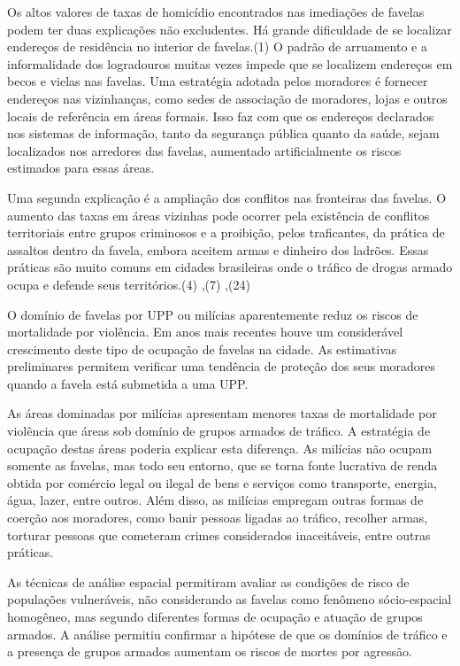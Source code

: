 \documentclass{article}
\begin{document}
Os altos valores de taxas de homicídio encontrados nas imediações de favelas
podem ter duas explicações não excludentes. Há grande dificuldade de se
localizar endereços de residência no interior de favelas.(1)
O padrão de arruamento e a informalidade dos logradouros muitas vezes impede que
se localizem endereços em becos e vielas nas favelas. Uma estratégia adotada
pelos moradores é fornecer endereços nas vizinhanças, como sedes de associação
de moradores, lojas e outros locais de referência em áreas formais. Isso faz com
que os endereços declarados nos sistemas de informação, tanto da segurança
pública quanto da saúde, sejam localizados nos arredores das favelas, aumentado
artificialmente os riscos estimados para essas áreas.

Uma segunda explicação é a ampliação dos conflitos nas fronteiras das favelas. O
aumento das taxas em áreas vizinhas pode ocorrer pela existência de conflitos
territoriais entre grupos criminosos e a proibição, pelos traficantes, da
prática de assaltos dentro da favela, embora aceitem armas e dinheiro dos
ladrões. Essas práticas são muito comuns em cidades brasileiras onde o tráfico
de drogas armado ocupa e defende seus territórios.(4)
,(7)
,(24)

O domínio de favelas por UPP ou milícias aparentemente reduz os riscos de
mortalidade por violência. Em anos mais recentes houve um considerável
crescimento deste tipo de ocupação de favelas na cidade. As estimativas
preliminares permitem verificar uma tendência de proteção dos seus moradores
quando a favela está submetida a uma UPP.

As áreas dominadas por milícias apresentam menores taxas de mortalidade por
violência que áreas sob domínio de grupos armados de tráfico. A estratégia de
ocupação destas áreas poderia explicar esta diferença. As milícias não ocupam
somente as favelas, mas todo seu entorno, que se torna fonte lucrativa de renda
obtida por comércio legal ou ilegal de bens e serviços como transporte, energia,
água, lazer, entre outros. Além disso, as milícias empregam outras formas de
coerção aos moradores, como banir pessoas ligadas ao tráfico, recolher armas,
torturar pessoas que cometeram crimes considerados inaceitáveis, entre outras
práticas.

As técnicas de análise espacial permitiram avaliar as condições de risco de
populações vulneráveis, não considerando as favelas como fenômeno sócio-espacial
homogêneo, mas segundo diferentes formas de ocupação e atuação de grupos
armados. A análise permitiu confirmar a hipótese de que os domínios de tráfico e
a presença de grupos armados aumentam os riscos de mortes por agressão.
\end{document}
